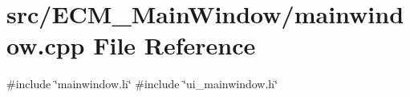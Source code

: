 \section{src/\+E\+C\+M\+\_\+\+Main\+Window/mainwindow.cpp File Reference}
\label{_e_c_m___main_window_2mainwindow_8cpp}
{\ttfamily \#include \char`\"{}mainwindow.\+h\char`\"{}}\newline
{\ttfamily \#include \char`\"{}ui\+\_\+mainwindow.\+h\char`\"{}}\newline
